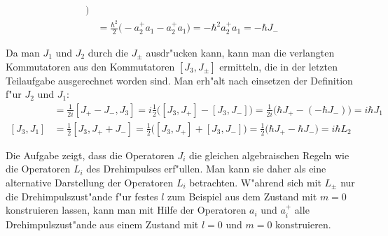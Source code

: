 \begin{loesung}
\begin{teilaufgaben}
\begin{align*}
\bigr)
\\
&=\frac{\hbar^2}{2}
\bigl(
-a_2^+a_1 - a_2^+a_1
\bigr)
=-\hbar^2 a_2^+a_1=-\hbar J_-
\end{align*}
\item 
Da man $J_1$ und $J_2$ durch die $J_\pm$ ausdr"ucken kann, kann man
die verlangten Kommutatoren aus den
Kommutatoren $[J_3,J_\pm]$ ermitteln, die in der letzten Teilaufgabe
ausgerechnet worden sind.
Man erh"alt nach einsetzen der Definition f"ur $J_2$ und $J_1$:
\begin{align*}
[J_2,J_3]
&=
\frac1{2i}[J_+-J_-,J_3]
=
i\frac{1}{2}\bigl([J_3,J_+] - [J_3,J_-]\bigr)
=
\frac1{2i}\bigl(\hbar J_+-(-\hbar J_-)\bigr)
=i\hbar J_1
\\
[J_3,J_1]
&=
\frac{1}{2}[J_3,J_++J_-]
=
\frac{1}{2}\bigl(
[J_3,J_+]
+
[J_3,J_-]
\bigr)
=\frac12\bigl(
\hbar J_+
-
\hbar J_-
\bigr)
=i\hbar L_2
\end{align*}
\end{teilaufgaben}
\end{loesung}

\begin{diskussion}
Die Aufgabe zeigt, dass die Operatoren $J_i$ die gleichen algebraischen
Regeln wie die Operatoren $L_i$ des Drehimpulses erf"ullen. 
Man kann sie daher als eine alternative Darstellung der Operatoren
$L_i$ betrachten.
W"ahrend sich mit $L_\pm$ nur die Drehimpulszust"ande f"ur festes
$l$ zum Beispiel aus dem Zustand mit $m=0$ konstruieren lassen,
kann man mit Hilfe der Operatoren $a_i$ und $a_i^+$ alle Drehimpulszust"ande
aus einem Zustand mit $l=0$ und $m=0$ konstruieren.
\end{diskussion}


